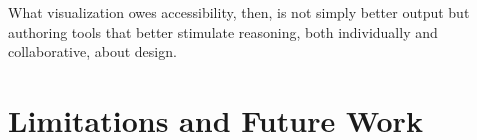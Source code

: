 \documentclass[12pt]{cmuthesis}
\begin{document}


What visualization owes accessibility, then, is not simply better output but authoring tools that better stimulate reasoning, both individually and collaborative, about design.



\section{Limitations and Future Work}
\end{document}

